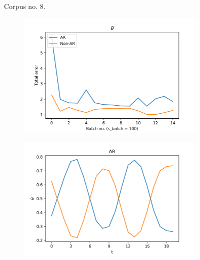 \documentclass[12pt]{article}
\begin{document}
\begin{figure}[H]
\begin{subfigure}[b]{0.3\textwidth}
  \end{subfigure}%
  \caption{Corpus no. $8$.}

\end{figure}

\begin{figure}[H]
  \centering
  \begin{subfigure}[b]{0.3\textwidth}
    \includegraphics[width=\linewidth]{performance_thetas_experiment-1|overlapping-yes_dataset-9.png}
  \end{subfigure}%
  \begin{subfigure}[b]{0.3\textwidth}
    \includegraphics[width=\linewidth]{latent_thetas_AR_experiment-1|overlapping-yes_dataset-9.png}
  \end{subfigure}%
  \begin{subfigure}[b]{0.3\textwidth}

\end{subfigure}
\end{figure}
\end{document}
